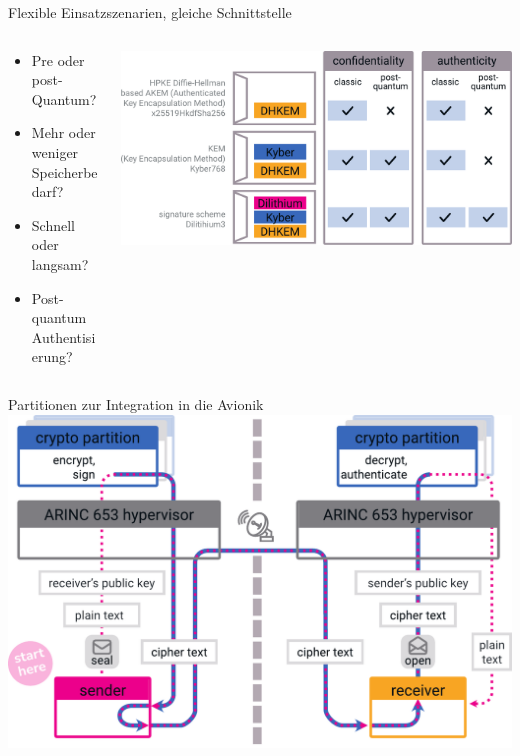 \begin{frame}[c]{Flexible Einsatzszenarien, gleiche Schnittstelle}
  \begin{columns}[fullwidth,c]
    \begin{column}{.35\linewidth}
      \begin{itemize}
        \item Pre oder post-Quantum?
        \item Mehr oder weniger Speicherbedarf?
        \item Schnell oder langsam?
        \item Post-quantum Authentisierung? 
      \end{itemize}
    \end{column}%
    \begin{column}{.65\linewidth}
      \includegraphics[width=\linewidth]{graphics/hpke variants}
    \end{column}
  \end{columns}
\end{frame}


\begin{frame}[c]{Partitionen zur Integration in die Avionik}
  \centering 
  \includegraphics[width=0.8\linewidth]{graphics/crypto partition}
\end{frame}

